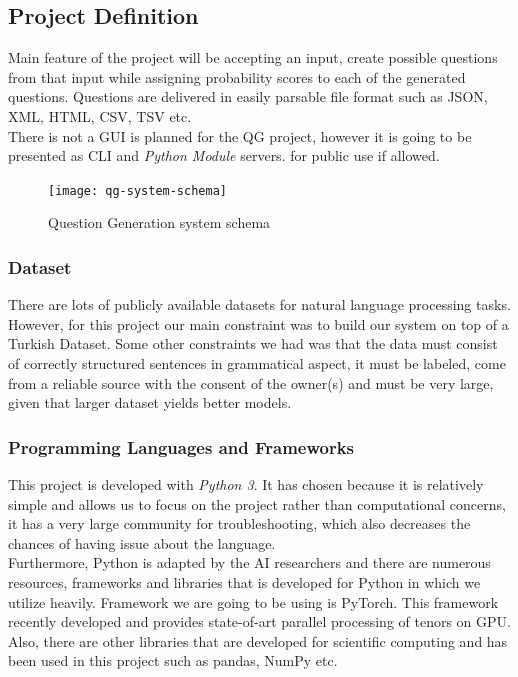\documentclass{mefsdp}
\begin{document}
	\subsection{Project Definition}
	Main feature of the project will be accepting an input, create possible questions from that input while assigning probability scores to each of the generated questions. Questions are delivered in easily parsable file format such as JSON, XML, HTML, CSV, TSV etc.\\
	
	There is not a GUI is planned for the QG project, however it is going to be presented as CLI and \textit{Python Module}\footnotemark {} servers. for public use if allowed.
\\
	
	\begin{figure}[ht!]
		\centering
		\texttt{[image: qg-system-schema]}
		\caption{Question Generation system schema}
	\end{figure}

	\subsubsection{Dataset}
	There are lots of publicly available datasets for natural language processing tasks. However, for this project our main constraint was to build our system on top of a Turkish Dataset. Some other constraints we had was that the data must consist of correctly structured sentences in grammatical aspect, it must be labeled, come from a reliable source with the consent of the owner(s) and must be very large, given that larger dataset yields better models.
	
	\subsubsection{Programming Languages and Frameworks}
	This project is developed with \textit{Python 3}. It has chosen because it is relatively simple and allows us to focus on the project rather than computational concerns, it has a very large community for troubleshooting, which also decreases the chances of having issue about the language.\\
	
	Furthermore, Python is adapted by the AI researchers and there are numerous resources, frameworks and libraries that is developed for Python in which we utilize heavily. Framework we are going to be using is PyTorch. This framework recently developed and provides state-of-art parallel processing of tenors on GPU. Also, there are other libraries that are developed for scientific computing and has been used in this project such as pandas, NumPy etc.\\
	
\end{document}
